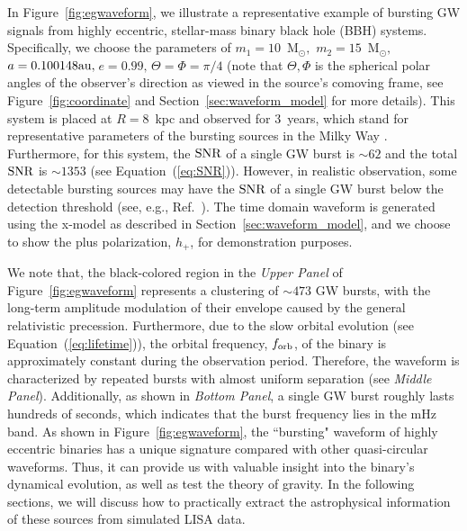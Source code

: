 \documentclass[%
 reprint,
 amsmath,amssymb,
 aps,
]{revtex4-2}
\begin{document}
In Figure~\ref{fig:egwaveform}, we illustrate a representative example of bursting GW signals from highly eccentric, stellar-mass binary black hole (BBH) systems. Specifically, we choose the parameters of $m_{1}=10$~M$_{\odot},$ $m_{2}=15$~M$_{\odot},\,$$a= 0.100148 {\rm au},\,$$e=0.99,\,$$\Theta=\Phi=\pi/4$ (note that $\Theta,\Phi$ is the spherical polar
angles of the observer's direction as viewed in the source's comoving frame, see Figure~\ref{fig:coordinate} and Section~\ref{sec:waveform_model} for more details). This system is placed at $R=8$~kpc and observed for $3$~years, which stand for representative parameters of the bursting sources in the Milky Way \citep[see, e.g., the population analysis in ][]{kremer18,Xuan+23b,Xuan24bkg}. Furthermore, for this system, the $\rm SNR$ of a single GW burst is $\sim 62$ and the total $\rm SNR$ is $\sim 1353$ (see Equation~(\ref{eq:SNR})). However, in realistic observation, some detectable bursting sources may have the $\rm SNR$ of a single GW burst below the detection threshold (see, e.g., Ref.~\citep{Xuan+23b}). The time domain waveform is generated using the x-model as described in Section~\ref{sec:waveform_model}, and we choose to show the plus polarization, $h_{+}$, for demonstration purposes. 

We note that, the black-colored region in the {\it Upper Panel} of Figure~\ref{fig:egwaveform} represents a clustering of $\sim 473$ GW bursts, with the long-term amplitude modulation of their envelope caused by the general relativistic precession. Furthermore, due to the slow orbital evolution (see Equation~(\ref{eq:lifetime})), the orbital frequency, $f_{\rm orb}$, of the binary is approximately constant during the observation period.
Therefore, the waveform is characterized by repeated bursts with almost uniform separation (see {\it Middle Panel}). Additionally, as shown in {\it Bottom Panel}, a single GW burst roughly lasts hundreds of seconds, which indicates that the burst frequency lies in the mHz band. As shown in Figure~\ref{fig:egwaveform}, the ``bursting" waveform of highly eccentric binaries has a unique signature compared with other quasi-circular waveforms. Thus, it can provide us with valuable insight into the binary's dynamical evolution, as well as test the theory of gravity. In the following sections, we will discuss how to practically extract the astrophysical information of these sources from simulated LISA data.
\end{document}
